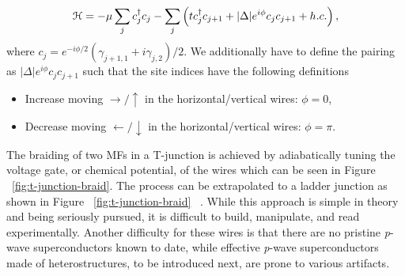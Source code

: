 \begin{equation}
  \mathcal{H} = -\mu \sum_j c^{\dagger}_j c_j - \sum_j \left(tc^{\dagger}_j c_{j+1} + |\Delta|e^{i\phi} c_j c_{j+1} + h.c. \right),
\end{equation}
where
$c_j = e^{-i\phi/2} (\gamma_{j+1,1} + i \gamma_{j,2})/2$.
We additionally have to define the pairing as
$|\Delta|e^{i\phi} c_j c_{j+1}$
such that the site indices have the following definitions
\begin{itemize}
  \item Increase moving $\rightarrow / \uparrow$ in the horizontal/vertical wires: $\phi = 0$,
  \item Decrease moving $\leftarrow / \downarrow$ in the horizontal/vertical wires: $\phi = \pi$.
\end{itemize}
The braiding of two MFs in a T-junction is achieved by adiabatically tuning the voltage gate, or chemical potential, of the wires which can be seen in Figure ~\ref{fig:t-junction-braid}.
The process can be extrapolated to a ladder junction as shown in Figure ~\ref{fig:t-junction-braid} ~\cite{aliceaNonAbelianStatisticsTopological2011}.
While this approach is simple in theory and being seriously pursued, it is difficult to build, manipulate, and read experimentally.
Another difficulty for these wires is that there are no pristine \textit{p}-wave superconductors known to date, while effective \textit{p}-wave superconductors made of heterostructures, to be introduced next, are prone to various artifacts.

